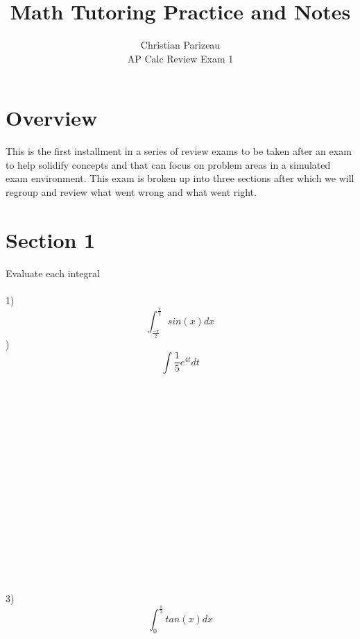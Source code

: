 \documentclass[12pt]{article}
\begin{document}
 
 
 
\title{Math Tutoring Practice and Notes}%
\author{Christian Parizeau\\ %
AP Calc Review Exam 1} %
 
\maketitle
\section{Overview}
This is the first installment in a series of review exams to be taken after an exam to help solidify concepts and that can focus on problem areas in a simulated exam environment. This exam is broken up into three sections after which we will regroup and review what went wrong and what went right. 

\section{Section 1}
Evaluate each integral \\\\
1)$$\int_{\frac{-\pi}{2}}^{\frac{\pi}{2}}sin(x)dx $$
)$$\int \frac{1}{5}e^{4t} dt $$
\\\\\\\\\\\\\\\\\\\\\\\\\\\\\\\\
3)$$\int_{0}^{\frac{\pi}{3}} tan(x) dx $$
\newpage
\end{document}
